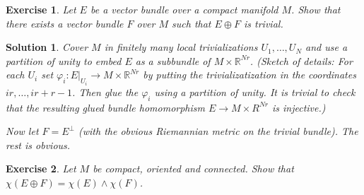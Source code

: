 \documentclass{article}
\newtheorem{ex}{Exercise}
\theoremstyle{nonumberplain}
\newtheorem{sol}{Solution}
\newcommand{\R}{\mathbb{R}}
\begin{document}
\begin{ex}
Let $E$ be a vector bundle over a compact manifold $M$. Show that there exists a vector bundle $F$ over $M$ such that $E \oplus F$ is trivial.
\end{ex}

\begin{sol}
Cover $M$ in finitely many local trivializations $U_1, \dots, U_N$ and use a partition of unity to embed $E$ as a subbundle of $M \times \R^{N r}$. (Sketch of details: For each $U_i$ set $\varphi_i \colon E|_{U_i} \to M \times \R^{Nr}$ by putting the trivializatization in the coordinates $ir, \dots, ir + r-1$. Then glue the $\varphi_i$ using a partition of unity. It is trivial to check that the resulting glued bundle homomorphism $E \to M \times R^{Nr}$ is injective.)

Now let $F = E^\perp$ (with the obvious Riemannian metric on the trivial bundle). The rest is obvious.
\end{sol}

\begin{ex}
Let $M$ be compact, oriented and connected. Show that $\chi(E \oplus F) = \chi(E) \wedge \chi(F)$.
\end{ex}
\end{document}
